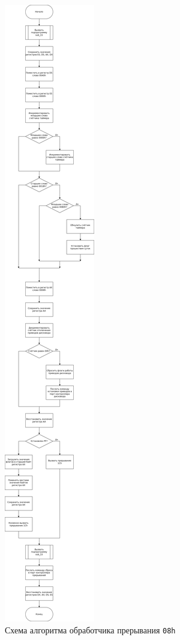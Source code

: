 \documentclass[
]{article}
\begin{document}
\begin{figure}
\centering
\includegraphics{img/fig-01.png}
\caption{Схема алгоритма обработчика прерывания \texttt{08h}}
\end{figure}
\end{document}
